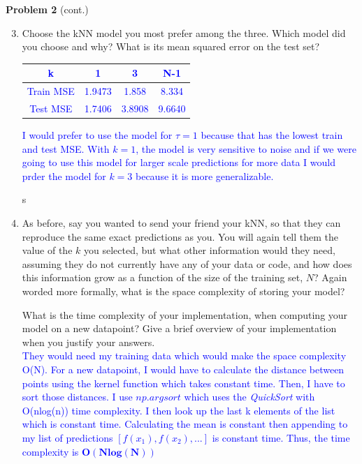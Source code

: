 \documentclass[submit]{harvardml}
\begin{document}
\newpage
\begin{framed}
\noindent\textbf{Problem 2} (cont.)\\
\begin{enumerate}
\setcounter{enumi}{2}
\item Choose the kNN model you most prefer among the three. Which model did you choose and why? What is its mean squared error on the test set?
\textcolor{blue}{
\begin{center}
\begin{tabular}{ |c|c|c|c| } 
 \hline
 k & 1 & 3 & N-1 \\ 
 \hline
 Train MSE & 1.9473 & 1.858 & 8.334 \\ 
 \hline
 Test MSE & 1.7406 & 3.8908 & 9.6640\\
 \hline
\end{tabular}
\label{Train MSE}
\end{center}
I would prefer to use the model for $\tau = 1$ because that has the lowest train and test MSE. With $k=1$, the model is very sensitive to noise and if we were going to use this model for larger scale predictions for more data I would prder the model for $k =3$ because it is more generalizable.
}
s
\item As before, say you wanted to send your friend your kNN, so that they can reproduce the same exact predictions as you. You will again tell them the value of the $k$ you selected, but what other information would they need, assuming they do not currently have any of your data or code, and how does this information grow as a function of the size of the training set, $N$? Again worded more formally, what is the space complexity of storing your model?

What is the time complexity of your implementation, when computing your model on a new datapoint? Give a brief overview of your implementation when you justify your answers. \\
\textcolor{blue}{
They would need my training data which would make the space complexity O(N). For a new datapoint, I would have to calculate the distance between points using the kernel function which takes constant time. Then, I have to sort those distances. I use $np.argsort$ which uses the \textit{QuickSort} with O(nlog(n)) time complexity. I then look up the last k elements of the list which is constant time. Calculating the mean is constant then appending to my list of predictions $[f(x_1), f(x_2), ...]$ is constant time. Thus, the time complexity is $\mathbf{O(Nlog(N))}$}
\end{enumerate}
\end{framed}
\end{document}
